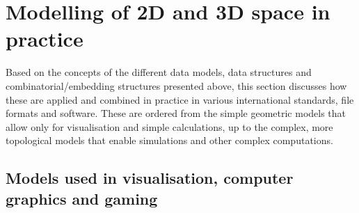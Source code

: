 \section{Modelling of 2D and 3D space in practice}
\label{se:modelling-space}

Based on the concepts of the different data models, data structures and combinatorial/embedding structures presented above, this section discusses how these are applied and combined in practice in various international standards, file formats and software.
These are ordered from the simple geometric models that allow only for visualisation and simple calculations, up to the complex, more topological models that enable simulations and other complex computations.

\subsection{Models used in visualisation, computer graphics and gaming}
\label{ss:graphics}


